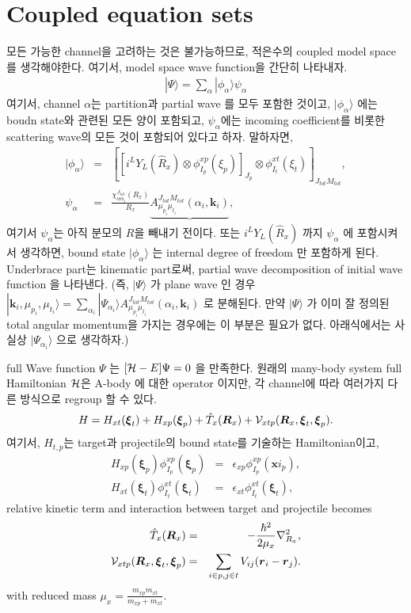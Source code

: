 \documentclass[11pt]{book}
\def\bm{\boldsymbol}
\def\vk{{\bm k}}
\def\vr{{\bm r}}
\def\ra{\rangle}
\newcommand{\bea}{\begin{eqnarray}}
\newcommand{\eea}{\end{eqnarray}}
\newcommand{\no}{\nonumber \\}
\begin{document}
\section{Coupled equation sets}
모든 가능한 channel을 고려하는 것은 불가능하므로, 적은수의 coupled model space를 생각해야한다.
여기서, model space wave function을 간단히 나타내자.
\bea 
|\Psi\ra =\sum_{\alpha} |\phi_\alpha\ra \psi_\alpha 
\eea 
여기서, channel $\alpha$는 partition과 partial wave 를 모두 포함한 것이고, 
$|\phi_\alpha\ra$ 에는 boudn state와 관련된 모든 양이 포함되고, 
$\psi_\alpha$에는 incoming coefficient를 비롯한 scattering wave의 모든 것이
포함되어 있다고 하자. 말하자면, 
\bea 
|\phi_\alpha\ra &=&  \left[ \left[i^{L} Y_{L}(\hat{R}_x)\otimes \phi^{xp}_{I_p}(\xi_p)\right]_{J_p} 
    \otimes \phi^{xt}_{I_t}(\xi_t)\right]_{J_{tot}M_{tot}},\no 
\psi_\alpha &=& \frac{\chi^{J_{tot}}_{\alpha \alpha_i}(R_x)  }{R_x} 
   \underbrace{A^{J_{tot} M_{tot}}_{\mu_{p_i}\mu_{t_i}}(\alpha_i,\vk_i)},    
\eea 
여기서 $\psi_\alpha$는 아직 분모의 $R$을 빼내기 전이다. 또는 $i^L Y_L(\hat{R}_x)$
까지 $\psi_\alpha$ 에 포함시켜서 생각하면, bound state $|\phi_\alpha\ra$ 는
internal degree of freedom 만 포함하게 된다. Underbrace part는 kinematic part로써,
partial wave decomposition of initial wave function 을 나타낸다. (즉, 
$|\Psi\ra$ 가 plane wave 인 경우 
$|\vk_i,\mu_{p_i},\mu_{t_i}\ra=
\sum_{\alpha_i}|\Psi_{\alpha_i}\ra 
A^{J_{tot} M_{tot}}_{\mu_{p_i}\mu_{t_i}}(\alpha_i,\vk_i)$ 로 분해된다. 만약 $|\Psi\ra$ 가 
이미 잘 정의된 total angular momentum을 가지는 경우에는 이 부분은 필요가 
없다. 아래식에서는 사실상 $|\Psi_{\alpha_i}\ra$ 으로 생각하자.) 

full Wave function $\Psi$ 는 $[{\cal H}-E]\Psi=0$ 을 만족한다.
원래의 many-body system full Hamiltonian ${\cal H}$은 A-body 에 대한 operator 이지만,
각 channel에 따라 여러가지 다른 방식으로 regroup 할 수 있다. 
\bea
H= H_{xt}({\bm \xi}_t)+H_{xp}({\bm \xi}_p)+\hat{T}_x({\bm R}_x)+{\cal V}_{xtp}({\bm R}_x,{\bm \xi}_t,{\bm \xi}_p).
\eea 
여기서, $H_{t,p}$는 target과 projectile의 bound state를 기술하는 Hamiltonian이고,
\bea 
H_{xp}({\bm \xi}_p) \phi^{xp}_{I_p}({\bm \xi}_p)&=&\epsilon_{xp}\phi_{I_p}^{xp}({\bm xi}_p),\no 
H_{xt}({\bm \xi}_t) \phi^{xt}_{I_t}({\bm \xi}_t)&=&\epsilon_{xt}\phi_{I_t}^{xt}({\bm \xi}_t),
\eea 
relative kinetic term and interaction between target and projectile becomes 
\bea 
\hat{T}_x({\bm R}_x)&=&-\frac{\hbar^2}{2\mu_x}\nabla_{R_x}^2,\no 
{\cal V}_{xtp}({\bm R}_x,{\bm \xi}_t,{\bm \xi}_p)&=&\sum_{i\in p, j\in t} V_{ij}(\vr_i-\vr_j).
\eea 
with reduced mass $\mu_x=\frac{m_{xp}m_{xt}}{m_{xp}+m_{xt}}$.
\end{document}
